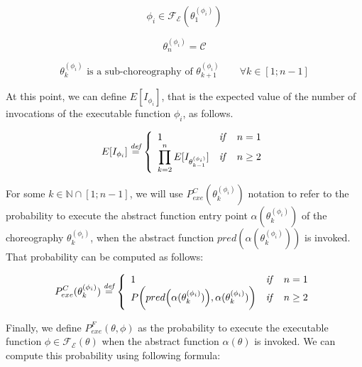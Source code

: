 \documentclass[12pt,a4paper]{report}
\newcommand*{\N}{\mathbb{N}}
\newcommand{\mathDef}{\overset{\textit{def}}{=}}
\theoremstyle{definition}
\begin{document}
\begin{equation}
	\phi_i \in \mathscr{F_E}(\theta^{(\phi_i)}_1)
\end{equation}

\begin{equation}
	\theta^{(\phi_i)}_n = \mathcal{C}
\end{equation}

\begin{equation}
	\theta^{(\phi_i)}_k \text{ is a sub-choreography of } \theta^{(\phi_i)}_{k+1} \qquad \forall k \in \left[1;n-1\right]
\end{equation}

At this point, we can define $E[I_{\phi_i}]$, that is the expected value of the number of invocations of the executable function $\phi_i$, as follows.

\begin{equation}	
	E[I_{\phi_i}] \mathDef \left\{
	\begin{array}{lcr}
		1 & \text{\textit{if}} & n = 1 \\ 
		\displaystyle \prod_{k = 2}^n E[I_{\theta_{k-1}^{(\phi_i)}}] & \text{\textit{if}} & n \geq 2 \\
	\end{array} \right.
\end{equation}

For some $k \in \N \cap \left[1;n-1\right]$, we will use $P_{exe}^C(\theta^{(\phi_i)}_k)$ notation to refer to the probability to execute the abstract function entry point $\alpha(\theta^{(\phi_i)}_k)$ of the choreography $\theta^{(\phi_i)}_k$, when the abstract function $pred(\alpha(\theta^{(\phi_i)}_k))$ is invoked. That probability can be computed as follows:

\begin{equation}	
	P_{exe}^C(\theta^{(\phi_i)}_k) \mathDef \left\{
	\begin{array}{lcr}
		1 & \text{\textit{if}} & n = 1 \\ 
	    P \bigg(  pred\Big( \alpha(\theta^{(\phi_i)}_{k}) \Big), \alpha(\theta^{(\phi_i)}_{k}) \bigg) & \text{\textit{if}} & n \geq 2 \\
	\end{array} \right.
\end{equation}


Finally, we define $P_{exe}^{F}(\theta, \phi)$ as the probability to execute the executable function $\phi \in \mathscr{F_E}(\theta)$ when the abstract function $\alpha(\theta)$ is invoked. We can compute this probability using following formula:
\end{document}
